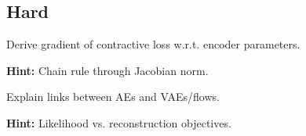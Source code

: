 \subsection*{Hard}

\begin{problem}
Derive gradient of contractive loss w.r.t. encoder parameters.

\textbf{Hint:} Chain rule through Jacobian norm.
\end{problem}

\begin{problem}
Explain links between AEs and VAEs/flows.

\textbf{Hint:} Likelihood vs. reconstruction objectives.
\end{problem}

